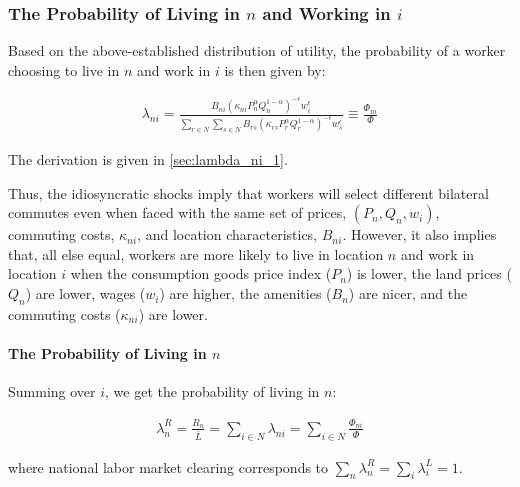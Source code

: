 \documentclass[10pt]{article}
\begin{document}
\subsubsection{The Probability of Living in $n$ and Working in $i$}

Based on the above-established distribution of utility, 
the probability of a worker choosing to live in $n$ 
and work in $i$ is then given by:

\begin{align}
    \lambda_{n i}=\frac{B_{n i}\left(\kappa_{n i} P_n^\alpha Q_n^{1-\alpha}\right)^{-\epsilon} w_i^\epsilon}{\sum_{r \in N} \sum_{s \in N} B_{r s}\left(\kappa_{r s} P_r^\alpha Q_r^{1-\alpha}\right)^{-\epsilon} w_s^\epsilon} \equiv \frac{\Phi_{n i}}{\Phi} \label{eq:lambda_ni_1}
\end{align}

The derivation is given in \autoref{sec:lambda_ni_1}.

Thus, the idiosyncratic shocks imply that 
workers will select different bilateral commutes even 
when faced with the same set of prices, $(P_n, Q_n, w_i)$,
commuting costs, $\kappa_{n i}$, and location characteristics, $B_{n i}$.
However, it also implies that, all else equal, 
workers are more likely to live in location $n$
and work in location $i$ when 
the consumption goods price index ($P_n$) is lower,
the land prices ($Q_n$) are lower, wages ($w_i$) are higher,
the amenities ($B_n$) are nicer, and the commuting 
costs ($\kappa_{n i}$) are lower.

\paragraph{The Probability of Living in $n$}

Summing over $i$, we get the probability of living in $n$:

\begin{align}
    \lambda_n^R=\frac{R_n}{\bar{L}}=\sum_{i \in N} \lambda_{n i}=\sum_{i \in N} \frac{\Phi_{n i}}{\Phi} \label{eq:lambda_n_R}
\end{align}

where national labor market clearing 
corresponds to $\sum_n \lambda_n^R=\sum_i \lambda_i^L=1$.

\end{document}
